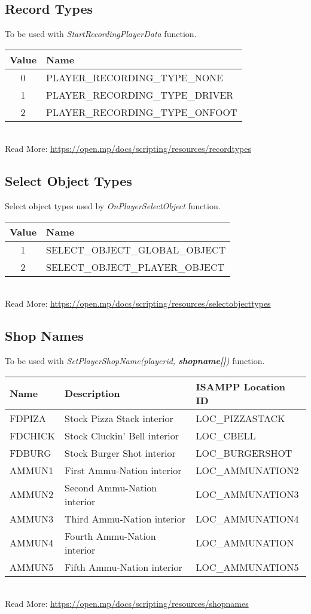 \documentclass{article}
\begin{document}
\subsection{Record Types}
To be used with \textit{StartRecordingPlayerData} function.
\bigskip
\\\begin{tabular}{ |c|l| }
\hline
Value & Name \\
\hline
0 & PLAYER\_RECORDING\_TYPE\_NONE \\
1 & PLAYER\_RECORDING\_TYPE\_DRIVER \\
2 & PLAYER\_RECORDING\_TYPE\_ONFOOT \\
\hline
\end{tabular}
\bigskip
\\Read More: \url{https://open.mp/docs/scripting/resources/recordtypes}


\subsection{Select Object Types}
Select object types used by \textit{OnPlayerSelectObject} function.
\bigskip
\\\begin{tabular}{ |c|l| }
\hline
Value & Name \\
\hline
1 & SELECT\_OBJECT\_GLOBAL\_OBJECT \\
2 & SELECT\_OBJECT\_PLAYER\_OBJECT \\
\hline
\end{tabular}
\bigskip
\\Read More: \url{https://open.mp/docs/scripting/resources/selectobjecttypes}


\newpage
\subsection{Shop Names}
To be used with \textit{SetPlayerShopName(playerid, \textbf{shopname[]})} function.
\bigskip
\\\begin{tabular}{ |l|l|l| }
\hline
Name & Description & ISAMPP Location ID \\
\hline
FDPIZA & Stock Pizza Stack interior & LOC\_PIZZASTACK \\
FDCHICK & Stock Cluckin' Bell interior & LOC\_CBELL \\
FDBURG & Stock Burger Shot interior & LOC\_BURGERSHOT \\
AMMUN1 & First Ammu-Nation interior & LOC\_AMMUNATION2 \\
AMMUN2 & Second Ammu-Nation interior & LOC\_AMMUNATION3 \\
AMMUN3 & Third Ammu-Nation interior & LOC\_AMMUNATION4 \\
AMMUN4 & Fourth Ammu-Nation interior & LOC\_AMMUNATION \\
AMMUN5 & Fifth Ammu-Nation interior & LOC\_AMMUNATION5 \\
\hline
\end{tabular}
\bigskip
\\Read More: \url{https://open.mp/docs/scripting/resources/shopnames}
\end{document}
